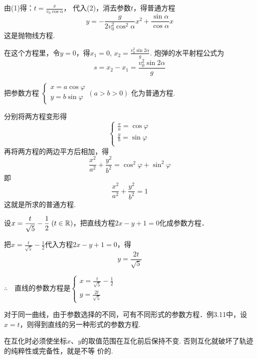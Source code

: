 \begin{solution}
由(1)得：$t=\frac{x}{v_0\cos\alpha}$，
代入(2)，消去参数$t$，得普通方程
\[y=-\frac{g}{2v^2_0\cos^2\alpha}x^2+\frac{\sin\alpha}{\cos\alpha}x\]
这是抛物线方程.

在这个方程里，令$y=0$，得$x_1=0$, $x_2=\frac{v^2_0 \sin2\alpha}{g}$. 炮弹的水平射程公式为
\[s=x_2-x_1=\frac{v^2_0 \sin2\alpha}{g}\]
\end{solution}

\begin{example}
    把参数方程
$\begin{cases}
    x=a\cos\varphi\\ y=b\sin\varphi
\end{cases}(a>b>0)$
化为普通方程.
\end{example}

\begin{solution}
分别将两方程变形得
\[\begin{cases}
    \frac{x}{a}=\cos\varphi\\[1.5ex]
    \frac{y}{b}=\sin\varphi\\
\end{cases}\]
再将两方程的两边平方后相加，得
\[\frac{x^2}{a^2}+\frac{y^2}{b^2}=\cos^2\varphi+\sin^2\varphi\]
即
\[\frac{x^2}{a^2}+\frac{y^2}{b^2}=1\]
这就是所求的普通方程.
\end{solution}



\begin{example}
    设$x=\dfrac{t}{\sqrt{5}}-\dfrac{1}{2}\; (t\in\mathbb{R})$，把直线方程$2x-y+1=0$化成参数方程．
\end{example}

\begin{solution}
把$x=\frac{t}{\sqrt{5}}-\frac{1}{2}$代入方程$2x-y+1=0$，得
\[y=\frac{2t}{\sqrt{5}}\]

$\therefore\quad $直线的参数方程是$\begin{cases}
    x=\frac{t}{\sqrt{5}}-\frac{1}{2}\\[1.5ex]
    y=\frac{2t}{\sqrt{5}}
\end{cases}$
\end{solution}


\begin{remark}
    对于同一曲线，由于参数选择的不同，可有不同形式的参数方程．例3.11中，设$x=t$，则得到直线的另一种形式的参数方程.
    
    在互化时必须使坐标$x$、$y$的取值范围在互化前后保持不变. 否则互化就破坏了轨迹的纯粹性或完备性，就是不等
价的.
\end{remark}

